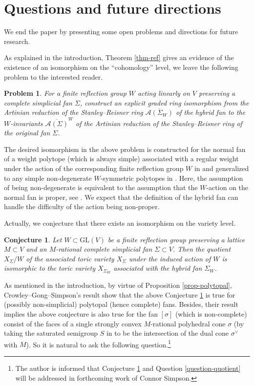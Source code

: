 \documentclass{amsart}
\newtheorem{conjecture}[theorem]{Conjecture}
\newtheorem{problem}[theorem]{Problem}
\theoremstyle{definition}
\theoremstyle{remark}
\numberwithin{equation}{section}
\begin{document}
\section{Questions and future directions} \label{sec-ques}
We end the paper by presenting some open problems and directions for future research.

As explained in the introduction, Theorem \ref{thm-ref} gives an evidence of the existence of an isomorphism on the ``cohomology'' level, we leave the following problem to the interested reader.

\begin{problem}
For a finite reflection group $W$ acting linearly on $V$ preserving a complete simplicial fan $\Sigma$, construct an explicit graded ring isomorphism from the Artinian reduction of the Stanley--Reisner ring $\overline{\mathcal{A}(\Sigma_W)}$ of the hybrid fan to the $W$-invariants $\overline{\mathcal{A}(\Sigma)}^W$ of the Artinian reduction of the Stanley--Reisner ring of the original fan $\Sigma$.
\end{problem}

The desired isomorphism in the above problem is constructed for the normal fan of a weight polytope (which is always simple) associated with a regular weight under the action of the corresponding finite reflection group $W$ in \cite{gui2025weyl} and generalized to any simple non-degenerate $W$-symmetric polytopes in \cite{gong2026invariants}. Here, the assumption of being non-degenerate is equivalent to the assumption that the $W$-action on the normal fan is proper, see \cite[Lemma 2.2]{gong2026invariants}. We expect that the definition of the hybrid fan can handle the difficulty of the action being non-proper. 

Actually, we conjecture that there exists an isomorphism on the variety level.

\begin{conjecture} \label{conj-quotient}
  Let $W \subset \mathrm{GL}(V)$ be a finite reflection group preserving a lattice $M \subset V$ and an $M$-rational complete simplicial fan $\Sigma \subset V$. Then the quotient $X_\Sigma / W$ of the  associated toric variety $X_\Sigma$ under the induced action of $W$ is isomorphic to the toric variety $X_{\Sigma_W}$ associated with the hybrid fan $\Sigma_W$.
\end{conjecture}

As mentioned in the introduction, by virtue of Proposition \ref{prop-polytopal}, Crowley--Gong--Simpson's result \cite[Corollary 1.3]{crowley2024toric} show that the above Conjecture \ref{conj-quotient} is true for (possibly non-simplicial) polytopal (hence complete) fans. Besides, their result \cite[Theorem 1.2]{crowley2024toric} implies the above conjecture is also true for the fan $[\sigma]$ (which is non-complete) consist of the faces of a single strongly convex $M$-rational polyhedral cone $\sigma$ (by taking the saturated semigroup $S$ in \cite[Theorem 1.2']{crowley2024toric} to be the intersection of the dual cone $\sigma^\vee$ with $M$). So it is natural to ask the following question.\footnote{The author is informed that Conjecture \ref{conj-quotient} and 
Question \ref{question-quotient} will be addressed in forthcoming work of Connor Simpson.}
\end{document}
